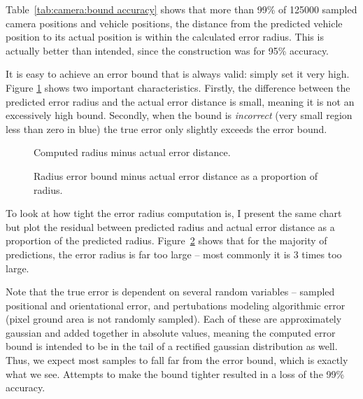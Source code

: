 \documentclass[a4paper,12pt,twoside,openright]{report}
\begin{document}
Table~\ref{tab:camera:bound accuracy} shows that more than 99\% of 125000 sampled camera positions
and vehicle positions, the distance from the predicted vehicle position to 
its actual position is within the calculated error radius. This
is actually better than intended, since the construction was for 95\% accuracy.

It is easy to achieve an error bound that is always valid: simply set it very high.
Figure \ref{fig:camera:diff bound error} shows two important characteristics. Firstly, the difference between
the predicted error radius and the actual error distance is small, meaning
it is not an excessively high bound. Secondly, when the bound is \textit{incorrect} (very small region less than zero in blue)
the true error only slightly exceeds the error bound.

\begin{figure}[htb]
    \begin{center}
        
    \end{center}
    \caption[Bound Minus True Distance]{Computed radius minus actual error distance.}
    \label{fig:camera:diff bound error}
\end{figure}

\begin{figure}[htb]
    \begin{center}
        
    \end{center}
    \caption[Bound Minus True Distance as a Proportion]{Radius error bound minus actual error distance as a proportion of radius.}
    \label{fig:camera:proportional diff}
\end{figure}

To look at how tight the error radius computation is, I present the same chart
but plot the residual between predicted radius and actual error distance as a 
proportion of the predicted radius. Figure~\ref{fig:camera:proportional diff} shows that for the majority
of predictions, the error radius is far too large -- most commonly it is 3 times 
too large. 

Note that the true error is dependent on several random variables -- sampled positional and orientational
error, and pertubations modeling algorithmic error (pixel ground area is not randomly sampled). Each
of these are approximately gaussian and added together in absolute values, meaning the computed error bound is intended to be in the tail
of a rectified gaussian distribution as well. Thus, we expect most samples to
fall far from the error bound, which is exactly what we see.
Attempts to make the bound tighter resulted in a loss of the 99\% accuracy.
\end{document}
